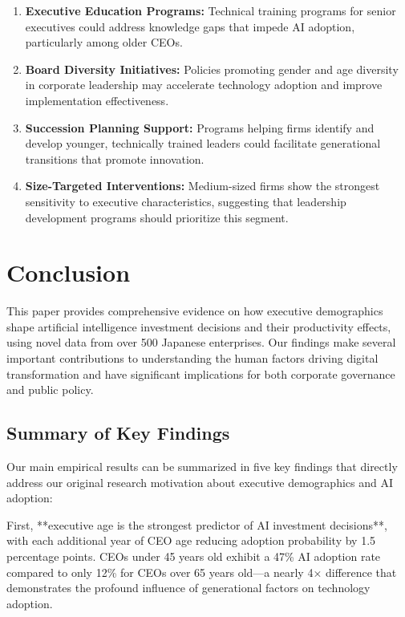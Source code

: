\documentclass[12pt, a4paper]{article}
\begin{document}
\begin{enumerate}
\item \textbf{Executive Education Programs:} Technical training programs for senior executives could address knowledge gaps that impede AI adoption, particularly among older CEOs.

\item \textbf{Board Diversity Initiatives:} Policies promoting gender and age diversity in corporate leadership may accelerate technology adoption and improve implementation effectiveness.

\item \textbf{Succession Planning Support:} Programs helping firms identify and develop younger, technically trained leaders could facilitate generational transitions that promote innovation.

\item \textbf{Size-Targeted Interventions:} Medium-sized firms show the strongest sensitivity to executive characteristics, suggesting that leadership development programs should prioritize this segment.
\end{enumerate}

\section{Conclusion}

This paper provides comprehensive evidence on how executive demographics shape artificial intelligence investment decisions and their productivity effects, using novel data from over 500 Japanese enterprises. Our findings make several important contributions to understanding the human factors driving digital transformation and have significant implications for both corporate governance and public policy.

\subsection{Summary of Key Findings}

Our main empirical results can be summarized in five key findings that directly address our original research motivation about executive demographics and AI adoption:

First, **executive age is the strongest predictor of AI investment decisions**, with each additional year of CEO age reducing adoption probability by 1.5 percentage points. CEOs under 45 years old exhibit a 47\% AI adoption rate compared to only 12\% for CEOs over 65 years old—a nearly 4× difference that demonstrates the profound influence of generational factors on technology adoption.
\end{document}
